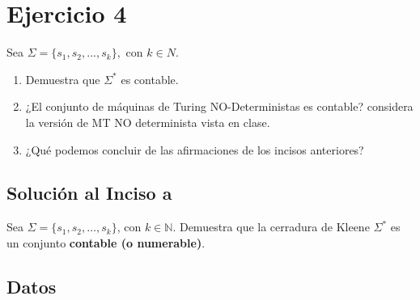 \section{Ejercicio 4}

\begin{tcolorbox}[enunciado]
Sea $\Sigma = \{ s_1, s_2,...,s_k\},$ con $k\in N$.
\begin{enumerate}[label=(\alph*)]
    \item Demuestra que $\Sigma^*$ es contable.
    \item ¿El conjunto de máquinas de Turing NO-Deterministas es contable? considera la versión de MT NO determinista vista en clase.
    \item ¿Qué podemos concluir de las afirmaciones de los incisos anteriores?
\end{enumerate}

\end{tcolorbox}

\subsection{Solución al Inciso a}

\begin{tcolorbox}[enunciado]
Sea $\Sigma = \{s_1, s_2, \dots, s_k\}$, con $k \in \mathbb{N}$. Demuestra que la cerradura de Kleene $\Sigma^*$ es un conjunto \textbf{contable (o numerable)}.
\end{tcolorbox}

\subsection*{Datos}

